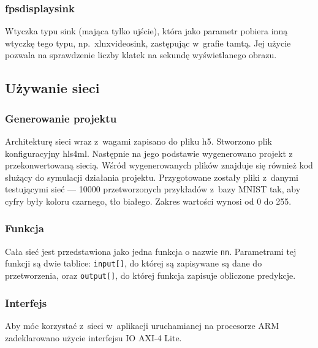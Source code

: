 \documentclass[12pt, oneside, a4paper]{article}
\begin{document}
\subsubsection{fpsdisplaysink}
Wtyczka typu sink (mająca tylko ujście), która jako parametr
pobiera inną wtyczkę tego typu, np.~xlnxvideosink,
zastępując w~grafie tamtą.
Jej użycie pozwala na sprawdzenie liczby klatek na sekundę
wyświetlanego obrazu.



\subsection{Używanie sieci}
\subsubsection{Generowanie projektu}
Architekturę sieci wraz z~wagami zapisano do pliku h5. Stworzono
plik konfiguracyjny hls4ml. Następnie na jego podstawie wygenerowano projekt
z przekonwertowaną siecią. Wśród wygenerowanych plików znajduje się
również kod służący do symulacji działania projektu. Przygotowane zostały
pliki z~danymi testującymi sieć --- 10000 przetworzonych przykładów z~bazy
MNIST tak, aby cyfry były koloru czarnego, tło białego. Zakres wartości
wynosi od 0 do 255.

\subsubsection{Funkcja}\label{section:funkcja}
Cała sieć jest przedstawiona jako jedna funkcja o nazwie \lstinline{nn}.
Parametrami tej funkcji są dwie tablice:
\lstinline[style=hls]{input[]}, do której są zapisywane są
dane do przetworzenia,
oraz \lstinline[style=hls]{output[]}, do której funkcja zapisuje
obliczone predykcje.

\begin{minipage}{\linewidth}

\end{minipage}

\subsubsection{Interfejs}
Aby móc korzystać z~sieci w~aplikacji uruchamianej na procesorze ARM
zadeklarowano użycie interfejsu IO \mbox{AXI-4} Lite.
\end{document}
